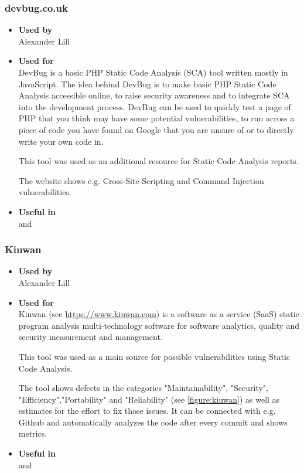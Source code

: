 \subsubsection*{devbug.co.uk}
\begin{itemize}
	\item \textbf{Used by}\\ Alexander Lill
	\item \textbf{Used for}\\
	DevBug is a basic PHP Static Code Analysis (SCA) tool written mostly in JavaScript. The idea behind DevBug is to make basic PHP Static Code Analysis accessible online, to raise security awareness and to integrate SCA into the development process. DevBug can be used to quickly test a page of PHP that you think may have some potential vulnerabilities, to run across a piece of code you have found on Google that you are unsure of or to directly write your own code in.
	
	This tool was used as an additional resource for Static Code Analysis reports.
	
	The website shows e.g. Cross-Site-Scripting and Command Injection vulnerabilities.
	\item \textbf{Useful in}\\  and 
\end{itemize}

\subsubsection*{Kiuwan}
\begin{itemize}
	\item \textbf{Used by}\\ Alexander Lill
	\item \textbf{Used for}\\
	Kiuwan (see \url{https://www.kiuwan.com}) is a software as a service (SaaS) static program analysis multi-technology software for software analytics, quality and security measurement and management.
	
	This tool was used as a main source for possible vulnerabilities using Static Code Analysis.
	
	The tool shows defects in the categories "Maintainability", "Security", "Efficiency","Portability" and "Reliability" (see \autoref{figure:kiuwan}) as well as estimates for the effort to fix those issues. It can be connected with e.g. Github and automatically analyzes the code after every commit and shows metrics.
	\item \textbf{Useful in}\\  and 
\end{itemize}

